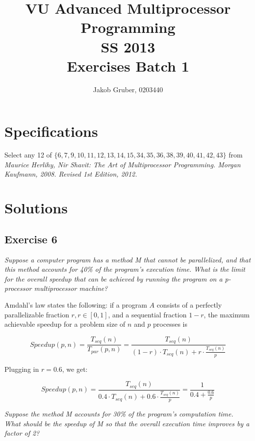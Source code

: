 \documentclass[a4paper,10pt]{article}
\title{VU Advanced Multiprocessor Programming \\
       SS 2013 \\
       Exercises Batch 1}
\author{Jakob Gruber, 0203440}
\begin{document}
\maketitle

\tableofcontents

\pagebreak

\section{Specifications}

Select any 12 of $\{6, 7, 9, 10, 11, 12, 13, 14, 15, 34, 35, 36, 38, 39, 40, 41, 42, 43\}$ 
from \emph{Maurice Herlihy, Nir Shavit: The Art of Multiprocessor Programming. 
Morgan Kaufmann, 2008. Revised 1st Edition, 2012.}

\section{Solutions}

\subsection{Exercise 6}

\emph{Suppose a computer program has a method M that cannot be parallelized, and
that this method accounts for 40\% of the program’s execution time. What is
the limit for the overall speedup that can be achieved by running the program
on a p-processor multiprocessor machine?}

\vspace{3mm}

Amdahl's law states the following: if a program $A$ consists of a perfectly parallelizable
fraction $r, r \in [0, 1]$, and a sequential fraction $1 - r$, the maximum achievable
speedup for a problem size of $n$ and $p$ processes is

\begin{displaymath}
Speedup(p, n) = \frac{T_{seq}(n)}{T_{par}(p, n)} = \frac{T_{seq}(n)}{(1 - r) \cdot T_{seq}(n) + r \cdot \frac{T_{seq}(n)}{p}}
\end{displaymath}

Plugging in $r = 0.6$, we get: 

\begin{displaymath}
Speedup(p, n) = \frac{T_{seq}(n)}{0.4 \cdot T_{seq}(n) + 0.6 \cdot \frac{T_{seq}(n)}{p}}
              = \frac{1}{0.4 + \frac{0.6}{p}}
\end{displaymath}

\emph{Suppose the method M accounts for 30\% of the program’s computation time.
What should be the speedup of M so that the overall execution time improves
by a factor of 2?}
\end{document}
